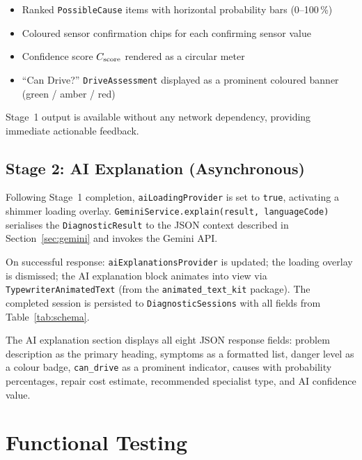 \begin{itemize}
  \item Ranked \texttt{PossibleCause} items with horizontal probability bars (0--100\,\%)
  \item Coloured sensor confirmation chips for each confirming sensor value
  \item Confidence score $C_{\mathrm{score}}$ rendered as a circular meter
  \item ``Can Drive?'' \texttt{DriveAssessment} displayed as a prominent coloured banner (green / amber / red)
\end{itemize}

Stage~1 output is available without any network dependency, providing immediate actionable feedback.

\subsection{Stage 2: AI Explanation (Asynchronous)}

Following Stage~1 completion, \texttt{aiLoadingProvider} is set to \texttt{true}, activating a shimmer loading overlay.
\texttt{GeminiService.explain(result, languageCode)} serialises the \texttt{DiagnosticResult} to the JSON context described in Section~\ref{sec:gemini} and invokes the Gemini API.

On successful response: \texttt{aiExplanationsProvider} is updated; the loading overlay is dismissed; the AI explanation block animates into view via \texttt{TypewriterAnimatedText} (from the \texttt{animated\_text\_kit} package).
The completed session is persisted to \texttt{DiagnosticSessions} with all fields from Table~\ref{tab:schema}.

The AI explanation section displays all eight JSON response fields: problem description as the primary heading, symptoms as a formatted list, danger level as a colour badge, \texttt{can\_drive} as a prominent indicator, causes with probability percentages, repair cost estimate, recommended specialist type, and AI confidence value.


\section{Functional Testing}
\label{sec:functional_testing}

